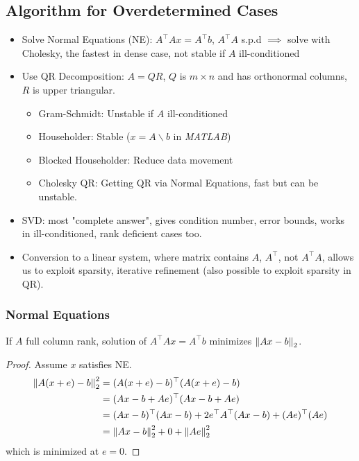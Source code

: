 \documentclass[11pt]{article}
\numberwithin{equation}{section}
\begin{document}
\subsection{Algorithm for Overdetermined Cases}
\begin{itemize}
    \item Solve Normal Equations (NE): $A^{\top} A{x}=A^{\top} b$, $A^{\top}A$ s.p.d $\implies$ solve with Cholesky, the fastest in dense case, not stable if $A$ ill-conditioned
    \item Use QR Decomposition: $A=QR$, $Q$ is $m \times n$ and has orthonormal columns, $R$ is upper triangular.
    \begin{itemize}
        \item Gram-Schmidt: Unstable if $A$ ill-conditioned
        \item Householder: Stable ($x=A\backslash b$ in \textit{MATLAB})
        \item Blocked Householder: Reduce data movement
        \item Cholesky QR: Getting QR via Normal Equations, fast but can be unstable.
    \end{itemize} 
    \item SVD: most "complete answer", gives condition number, error bounds, works in ill-conditioned, rank deficient cases too.
    \item Conversion to a linear system, where matrix contains $A$, $A^\top$, not $A^\top A$, allows us to exploit sparsity, iterative refinement (also possible to exploit sparsity in QR).
\end{itemize}

\subsubsection{Normal Equations}
\begin{theorem}
    If $A$ full column rank, solution of $A^\top Ax = A^\top b$ minimizes $\left\| Ax-b \right\|_2$.
    \begin{proof}
        Assume $x$ satisfies NE.
        \begin{align*}
            \left\| A(x + e)-b \right\|_2^2 &= (A(x + e)-b)^\top (A(x + e)-b) \\
            &= (Ax-b+Ae)^\top(Ax-b+Ae) \\
            &= (Ax-b)^\top(Ax-b) + 2e^\top A^\top(Ax-b) + (Ae)^\top(Ae) \\
            &= \left\| Ax-b \right\|_2^2 + 0 + \left\| Ae \right\|_2^2
        \end{align*}
        which is minimized at $e=0$.
    \end{proof}
\end{theorem}
\end{document}
